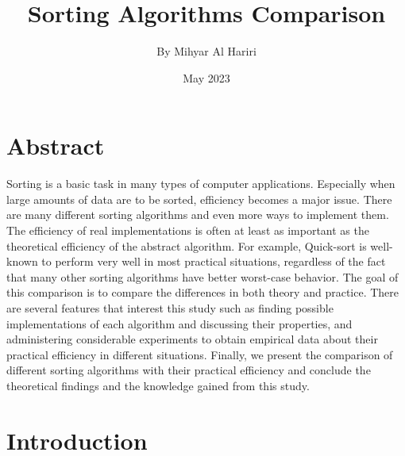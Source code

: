 \documentclass{article}
\title{Sorting Algorithms Comparison}
\author{By Mihyar Al Hariri}
\date{May 2023}
\begin{document}
\maketitle
\newpage
\tableofcontents
\newpage
\section{Abstract}
Sorting is a basic task in many types of computer applications. Especially when 
large amounts of data are to be sorted, efficiency becomes a major issue. There
are many different sorting algorithms and even more ways to implement them. The efficiency of real implementations is often at least as important
as the theoretical efficiency of the abstract algorithm. For example, Quick-sort is
well-known to perform very well in most practical situations, regardless of the fact
that many other sorting algorithms have better worst-case behavior. The goal
of this comparison  is to compare the differences in both theory and practice. There are several features that
interest this study such as finding possible implementations of each algorithm and
discussing their properties, and administering considerable experiments to obtain
empirical data about their practical efficiency in different situations. Finally, we
present the comparison of different sorting algorithms with their practical efficiency
and conclude the theoretical findings and the knowledge gained from this study.\cite{karunanithi2014survey}
\section{Introduction}
\end{document}
